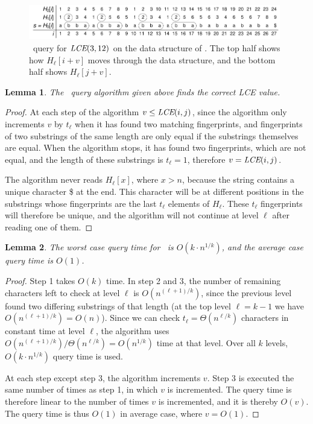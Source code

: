 \documentclass[a4]{article}
\newcommand*{\pref}{\prettyref}
\newtheorem{lemma}{Lemma}
\begin{document}
\begin{figure}[tp]
    \begin{center}
        \includegraphics[width=0.98\textwidth,page=2]{fingerprint.pdf}
    \end{center}
    \caption{\label{fig:fingerprint-query}\fprintk\ query for $\textit{LCE}(3,12)$ on the data structure of \pref{fig:fingerprint-ds}. The top half shows how $H_\ell[i+v]$ moves through the data structure, and the bottom half shows $H_\ell[j+v]$.}
\end{figure}

\begin{lemma}
The \fprintk\ query algorithm given above finds the correct LCE value.
\end{lemma}
\begin{proof}
At each step of the algorithm $v \leq \textit{LCE}(i,j)$, since the algorithm only increments $v$ by $t_\ell$ when it has found two matching fingerprints, and fingerprints of two substrings of the same length are only equal if the substrings themselves are equal. When the algorithm stops, it has found two fingerprints, which are not equal, and the length of these substrings is $t_\ell = 1$, therefore $v = \textit{LCE}(i,j)$.

The algorithm never reads $H_\ell[x]$, where $x>n$, because the string contains a unique character \$ at the end. This character will be at different positions in the substrings whose fingerprints are the last $t_\ell$ elements of $H_\ell$. These $t_\ell$ fingerprints will therefore be unique, and the algorithm will not continue at level $\ell$ after reading one of them.
\end{proof}

\begin{lemma}
The worst case query time for \fprintk\ is $O(k\cdot n^{1/k})$, and the average case query time is $O(1)$.
\end{lemma}
\begin{proof}
Step 1 takes $O(k)$ time. In step 2 and 3, the number of remaining characters left to check at level $\ell$ is $O(n^{(\ell+1)/k})$, since the previous level found two differing substrings of that length (at the top level $\ell=k-1$ we have $O(n^{(\ell+1)/k}) = O(n)$). Since we can check $t_\ell = \Theta(n^{\ell/k})$ characters in constant time at level $\ell$, the algorithm uses $O(n^{(\ell+1)/k})/\Theta(n^{\ell/k}) = O(n^{1/k})$ time at that level. Over all $k$ levels, $O(k\cdot n^{1/k})$ query time is used.

At each step except step 3, the algorithm increments $v$. Step 3 is executed the same number of times as step 1, in which $v$ is incremented. The query time is therefore linear to the number of times $v$ is incremented, and it is thereby $O(v)$. The query time is thus $O(1)$ in average case, where $v=O(1)$.
\end{proof}
\end{document}

